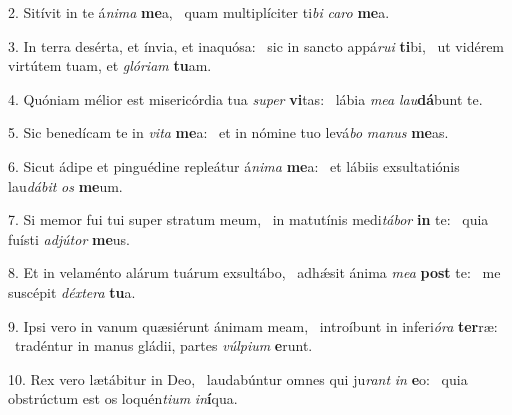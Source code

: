 2. Sitívit in te á\textit{ni}\textit{ma} \textbf{me}a, \ast\  quam multiplíciter ti\textit{bi} \textit{ca}\textit{ro} \textbf{me}a.\

3. In terra desérta, et ínvia, et inaquósa: \dag\  sic in sancto appá\textit{ru}\textit{i} \textbf{ti}bi, \ast\  ut vidérem virtútem tuam, et \textit{gló}\textit{ri}\textit{am} \textbf{tu}am.\

4. Quóniam mélior est misericórdia tua \textit{su}\textit{per} \textbf{vi}tas: \ast\  lábia \textit{me}\textit{a} \textit{lau}\textbf{dá}bunt te.\

5. Sic benedícam te in \textit{vi}\textit{ta} \textbf{me}a: \ast\  et in nómine tuo levá\textit{bo} \textit{ma}\textit{nus} \textbf{me}as.\

6. Sicut ádipe et pinguédine repleátur á\textit{ni}\textit{ma} \textbf{me}a: \ast\  et lábiis exsultatiónis lau\textit{dá}\textit{bit} \textit{os} \textbf{me}um.\

7. Si memor fui tui super stratum meum, \dag\  in matutínis medi\textit{tá}\textit{bor} \textbf{in} te: \ast\  quia fuísti \textit{ad}\textit{jú}\textit{tor} \textbf{me}us.\

8. Et in velaménto alárum tuárum exsultábo, \dag\  adhǽsit ánima \textit{me}\textit{a} \textbf{post} te: \ast\  me suscépit \textit{déx}\textit{te}\textit{ra} \textbf{tu}a.\

9. Ipsi vero in vanum quæsiérunt ánimam meam, \dag\  introíbunt in inferi\textit{ó}\textit{ra} \textbf{ter}ræ: \ast\  tradéntur in manus gládii, partes \textit{vúl}\textit{pi}\textit{um} \textbf{e}runt.\

10. Rex vero lætábitur in Deo, \dag\  laudabúntur omnes qui ju\textit{rant} \textit{in} \textbf{e}o: \ast\  quia obstrúctum est os loquén\textit{ti}\textit{um} \textit{in}\textbf{í}qua.\

